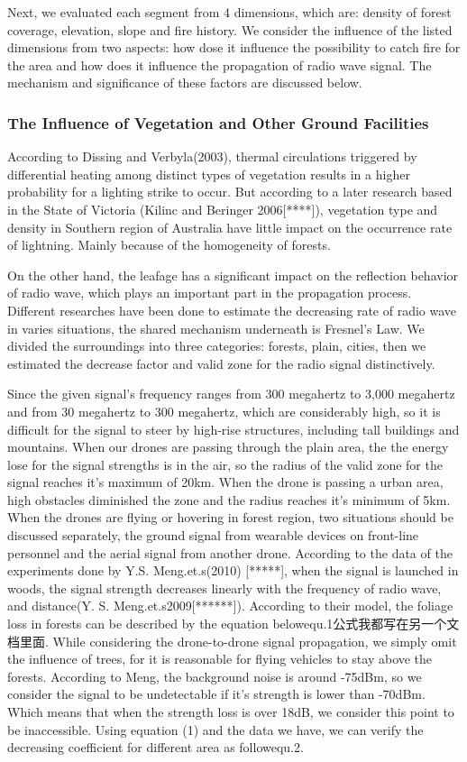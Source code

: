 \documentclass[13pt]{ctexart} %
\begin{document}
Next, we evaluated each segment from 4 dimensions, which are: density of forest coverage, elevation, slope and fire history. We consider the influence of the listed dimensions from two aspects: how dose it influence the possibility to catch fire for the area and how does it influence the propagation of radio wave signal. The mechanism and significance of these factors are discussed below.

\subsubsection{The Influence of Vegetation and Other Ground Facilities}
According to Dissing and Verbyla(2003)\cite{ref01}, thermal circulations triggered by differential heating among distinct types of vegetation results in a higher probability for a lighting strike to occur. But according to a later research based in the State of Victoria (Kilinc and Beringer 2006[****]), vegetation type and density in Southern region of Australia have little impact on the occurrence rate of lightning. Mainly because of the homogeneity of forests.

On the other hand, the leafage has a significant impact on the reflection behavior of radio wave, which plays an important part in the propagation process. Different researches have been done to estimate the decreasing rate of radio wave in varies situations, the shared mechanism underneath is Fresnel's Law. We divided the surroundings into three categories: forests, plain, cities, then we estimated the decrease factor and valid zone for the radio signal distinctively.

Since the given signal's frequency ranges from 300 megahertz to 3,000 megahertz and from 30 megahertz to 300 megahertz, which are considerably high, so it is difficult for the signal to steer by high-rise structures, including tall buildings and mountains. When our drones are passing through the plain area, the the energy lose for the signal strengths is in the air, so the radius of the valid zone for the signal reaches it's maximum of 20km. When the drone is passing a urban area, high obstacles diminished the zone and the radius reaches it's minimum of 5km. When the drones are flying or hovering in forest region, two situations should be discussed separately, the ground signal from wearable devices on front-line personnel and the aerial signal from another drone. According to the data of the experiments done by Y.S. Meng.et.s(2010) [*****], when the signal is launched in woods, the signal strength decreases linearly with the frequency of radio wave, and distance(Y. S. Meng.et.s2009[******]). According to their model, the foliage loss in forests can be described by the equation below{equ.1公式我都写在另一个文档里面}. While considering the drone-to-drone signal propagation, we simply omit the influence of trees, for it is reasonable for flying vehicles to stay above the forests. According to Meng, the background noise is around -75dBm, so we consider the signal to be undetectable if it's strength is lower than -70dBm. Which means that when the strength loss is over 18dB, we consider this point to be inaccessible. Using equation (1) and the data we have, we can verify the decreasing coefficient for different area as follow{equ.2}.
\end{document}
